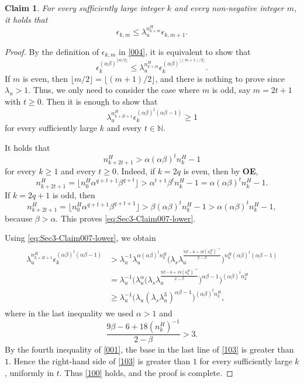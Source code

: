 \documentclass{amsart}
\theoremstyle{plain}
\newtheorem{clm}[thm]{Claim}
\theoremstyle{definition}
\theoremstyle{remark}
\numberwithin{equation}{section}
\begin{document}
\begin{clm}\label{007} For every sufficiently large integer $k$ and every non-negative integer $m$, it holds that
\[\epsilon_{k,m}\le\lambda_u^{n_{k+m}^H}\epsilon_{k,m+1}.\]
\end{clm}
\begin{proof}
By the definition of $\epsilon_{k,m}$ in \eqref{004}, it is equivalent to show that
\[
\epsilon_k^{(\alpha\beta)^{\lfloor m/2\rfloor}}
\le
\lambda_u^{n_{k+m}^H}\epsilon_k^{(\alpha\beta)^{\lfloor (m+1)/2\rfloor}}.
\]
If $m$ is even, then $\lfloor m/2\rfloor=\lfloor (m+1)/2\rfloor$, and there is nothing to prove since $\lambda_u>1$.
Thus, we only need to consider the case where $m$ is odd, say $m=2t+1$ with $t\ge0$.
Then it is enough to show that
\begin{equation}\label{100}
\lambda_u^{n_{k+2t+1}^H}\epsilon_k^{(\alpha\beta)^t(\alpha\beta-1)}\ge 1
\end{equation}
for every sufficiently large $k$ and every $t\in\mathbb{N}$.

It holds that
\begin{equation}\label{eq:Sec3-Claim007-lower}
n_{k+2t+1}^H>\alpha(\alpha\beta)^t n_k^H-1
\end{equation}
for every $k\ge1$ and every $t\ge0$.
Indeed, if $k=2q$ is even, then by {\bf OE},
\[
n_{k+2t+1}^H=\lfloor n_0^H\alpha^{q+t+1}\beta^{q+t}\rfloor
>
\alpha^{t+1}\beta^t n_k^H-1
=
\alpha(\alpha\beta)^t n_k^H-1.
\]
If $k=2q+1$ is odd, then
\[
n_{k+2t+1}^H=\lfloor n_0^H\alpha^{q+t+1}\beta^{q+t+1}\rfloor
>
\beta(\alpha\beta)^t n_k^H-1
>
\alpha(\alpha\beta)^t n_k^H-1,
\]
because $\beta>\alpha$.
This proves \eqref{eq:Sec3-Claim007-lower}.

Using \eqref{eq:Sec3-Claim007-lower}, we obtain
\begin{align}\label{103}
\begin{split}
\lambda_u^{n_{k+2t+1}^H}\epsilon_k^{(\alpha\beta)^t(\alpha\beta-1)}
&>
\lambda_u^{-1}\lambda_u^{\alpha(\alpha\beta)^t n_k^H}
\Big(\lambda_s\lambda_u^{\frac{9\beta-6+18(n_k^H)^{-1}}{2-\beta}}\Big)^{n_k^H(\alpha\beta)^t(\alpha\beta-1)}\\
&=
\lambda_u^{-1}
\Big(
\lambda_u^\alpha
\Big(\lambda_s\lambda_u^{\frac{9\beta-6+18(n_k^H)^{-1}}{2-\beta}}\Big)^{\alpha\beta-1}
\Big)^{(\alpha\beta)^t n_k^H}\\
&\ge
\lambda_u^{-1}
\Big(\lambda_u(\lambda_s\lambda_u^3)^{\alpha\beta-1}\Big)^{(\alpha\beta)^t n_k^H},
\end{split}
\end{align}
where in the last inequality we used $\alpha>1$ and
\[
\frac{9\beta-6+18(n_k^H)^{-1}}{2-\beta}>3.
\]
By the fourth inequality of \eqref{001}, the base in the last line of \eqref{103} is greater than $1$.
Hence the right-hand side of \eqref{103} is greater than $1$ for every sufficiently large $k$, uniformly in $t$.
Thus \eqref{100} holds, and the proof is complete.
\end{proof}
\end{document}
